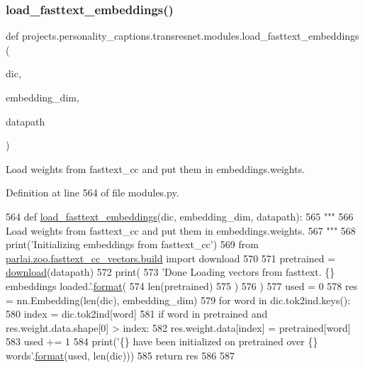 \subsubsection{\texorpdfstring{load\+\_\+fasttext\+\_\+embeddings()}{load\_fasttext\_embeddings()}}
{\footnotesize\ttfamily def projects.\+personality\+\_\+captions.\+transresnet.\+modules.\+load\+\_\+fasttext\+\_\+embeddings (\begin{DoxyParamCaption}\item[{}]{dic,  }\item[{}]{embedding\+\_\+dim,  }\item[{}]{datapath }\end{DoxyParamCaption})}

\begin{DoxyVerb}Load weights from fasttext_cc and put them in embeddings.weights.
\end{DoxyVerb}
 

Definition at line 564 of file modules.\+py.


\begin{DoxyCode}
564 \textcolor{keyword}{def }\hyperlink{namespaceprojects_1_1personality__captions_1_1transresnet_1_1modules_a96bada548530832446cf3ca02442b9d4}{load\_fasttext\_embeddings}(dic, embedding\_dim, datapath):
565     \textcolor{stringliteral}{"""}
566 \textcolor{stringliteral}{    Load weights from fasttext\_cc and put them in embeddings.weights.}
567 \textcolor{stringliteral}{    """}
568     print(\textcolor{stringliteral}{'Initializing embeddings from fasttext\_cc'})
569     \textcolor{keyword}{from} \hyperlink{namespaceparlai_1_1zoo_1_1fasttext__cc__vectors_1_1build}{parlai.zoo.fasttext\_cc\_vectors.build} \textcolor{keyword}{import} download
570 
571     pretrained = \hyperlink{namespaceparlai_1_1core_1_1build__data_ab74f0e428f05e5d91fa93c8afb367622}{download}(datapath)
572     print(
573         \textcolor{stringliteral}{'Done Loading vectors from fasttext. \{\} embeddings loaded.'}.\hyperlink{namespaceparlai_1_1chat__service_1_1services_1_1messenger_1_1shared__utils_a32e2e2022b824fbaf80c747160b52a76}{format}(
574             len(pretrained)
575         )
576     )
577     used = 0
578     res = nn.Embedding(len(dic), embedding\_dim)
579     \textcolor{keywordflow}{for} word \textcolor{keywordflow}{in} dic.tok2ind.keys():
580         index = dic.tok2ind[word]
581         \textcolor{keywordflow}{if} word \textcolor{keywordflow}{in} pretrained \textcolor{keywordflow}{and} res.weight.data.shape[0] > index:
582             res.weight.data[index] = pretrained[word]
583             used += 1
584     print(\textcolor{stringliteral}{'\{\} have been initialized on pretrained over \{\} words'}.\hyperlink{namespaceparlai_1_1chat__service_1_1services_1_1messenger_1_1shared__utils_a32e2e2022b824fbaf80c747160b52a76}{format}(used, len(dic)))
585     \textcolor{keywordflow}{return} res
586 
587 
\end{DoxyCode}
